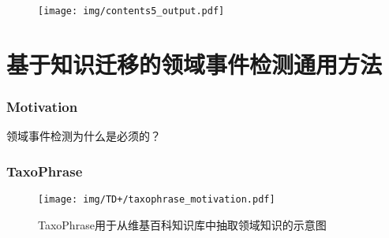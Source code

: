 \begin{withoutheadline}
\begin{frame}
\vspace*{-13mm}
\begin{figure}
	\hspace*{-4.2mm}
    \texttt{[image: img/contents5\_output.pdf]}
\end{figure}

\end{frame}
\end{withoutheadline}

\section{基于知识迁移的领域事件检测通用方法}
\begin{frame}
\frametitle{Motivation}
领域事件检测为什么是必须的？
\end{frame}

\begin{frame}
\frametitle{TaxoPhrase}	

\begin{figure}
	\caption{TaxoPhrase用于从维基百科知识库中抽取领域知识的示意图}
    \texttt{[image: img/TD+/taxophrase\_motivation.pdf]}
\end{figure}
\end{frame}

